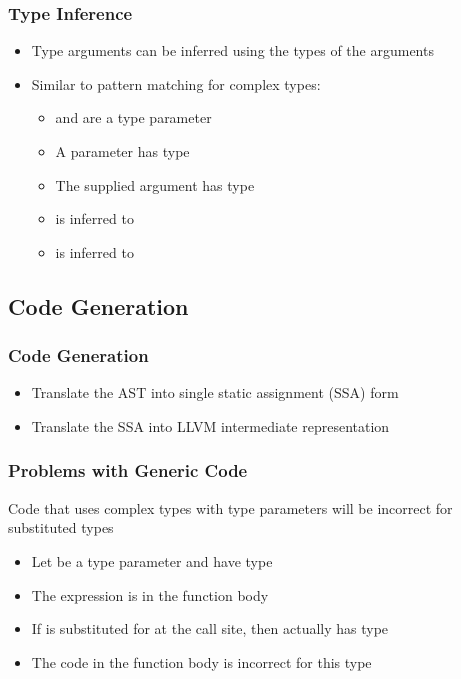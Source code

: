 \documentclass[12pt]{beamer}
\begin{document}

\begin{frame}[fragile]
\frametitle{Type Inference}
\begin{itemize}
\item Type arguments can be inferred using the types of the arguments
\item Similar to pattern matching for complex types:
  \begin{itemize}
  \item {} and  are a type parameter
  \item A parameter has type 
  \item The supplied argument has type 
  \item {} is inferred to 
  \item {} is inferred to 
  \end{itemize}
\end{itemize}
\end{frame}

\subsection{Code Generation}

\begin{frame}[fragile]
\frametitle{Code Generation}
\begin{itemize}
\item Translate the AST into single static assignment (SSA) form
\item Translate the SSA into LLVM intermediate representation
\end{itemize}
\end{frame}


\begin{frame}[fragile]
\frametitle{Problems with Generic Code}
Code that uses complex types with type parameters will be incorrect for substituted types
\begin{itemize}
\item Let  be a type parameter and  have type 
\item The expression  is in the function body
\item If  is substituted for  at the call site, then  actually has type 
\item The code in the function body is incorrect for this type
\end{itemize}
\end{frame}
\end{document}
